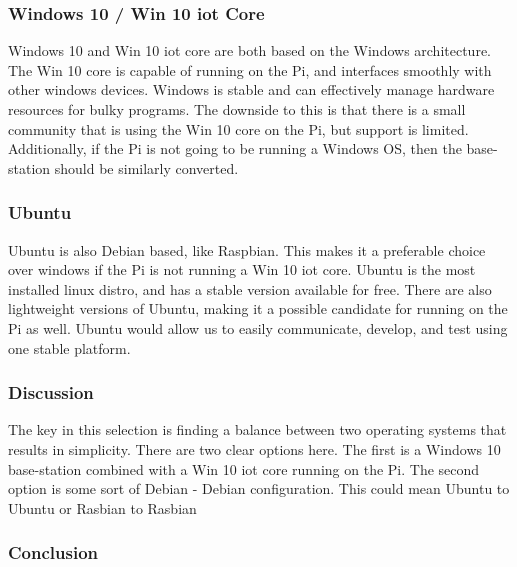 \documentclass[onecolumn, draftclsnofoot,10pt, compsoc]{IEEEtran}
\begin{document}

\subsubsection{Windows 10 / Win 10 iot Core}

Windows 10 and Win 10 iot core\cite{r28} are both based on the Windows 
architecture. The Win 10 core is capable of running on the Pi, and 
interfaces smoothly with other windows devices. Windows is stable 
and can effectively manage hardware resources for bulky programs. 
The downside to this is that there is a small community that is 
using the Win 10 core on the Pi, but support is limited. 
Additionally, if the Pi is not going to be running a Windows OS, 
then the base-station should be similarly converted. 


\subsubsection{Ubuntu}

Ubuntu\cite{r29} is also Debian based, like Raspbian. This makes it a 
preferable choice over windows if the Pi is not running a Win 10 
iot core. Ubuntu is the most installed linux distro, and has a 
stable version available for free. There are also lightweight 
versions of Ubuntu, making it a possible candidate for running on 
the Pi as well. Ubuntu would allow us to easily communicate, 
develop, and test using one stable platform.  


\subsubsection{Discussion}

The key in this selection is finding a balance between two 
operating systems that results in simplicity. There are two clear 
options here. The first is a Windows 10 base-station combined with 
a Win 10 iot core running on the Pi. The second option is some sort 
of Debian - Debian configuration. This could mean Ubuntu to Ubuntu 
or Rasbian to Rasbian


\subsubsection{Conclusion}
\end{document}
